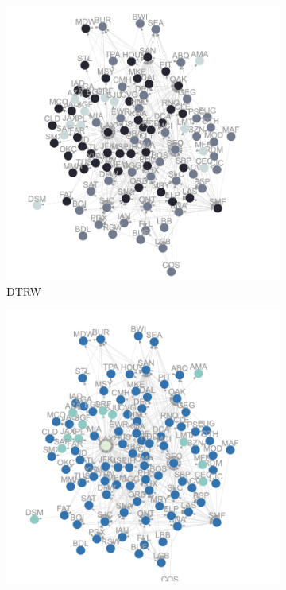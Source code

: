 \documentclass[12pt,a4paper]{article}
\begin{document}
\begin{figure}[H]
  \begin{subfigure}[b]{0.3\textwidth}
    \centering
    \includegraphics[width=\textwidth]{flight_net/flight partition t100.png}
    \caption{DTRW}
    \label{fig:flights 100 dtrw}
  \end{subfigure}
  \hfill
  \begin{subfigure}[b]{0.3\textwidth}
    \centering
    \includegraphics[width=\textwidth]{flight_net/flights partition t100 wt.png}

\end{subfigure}
\end{figure}
\end{document}
